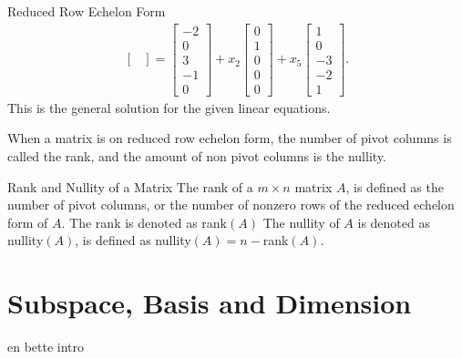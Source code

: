 \begin{example}{Reduced Row Echelon Form}
\begin{align*}
\begin{bmatrix}
        \end{bmatrix}=
        \begin{bmatrix}
      	    -2\\ 0 \\ 3 \\-1 \\0
        \end{bmatrix} + x_2
        \begin{bmatrix}
            0 \\ 1 \\ 0 \\ 0 \\ 0 
        \end{bmatrix} + x_5
        \begin{bmatrix}
            1 \\ 0 \\ -3 \\ -2 \\ 1
        \end{bmatrix}.
    \end{align*}
This is the general solution for the given linear equations.
\end{example}
When a matrix is on reduced row echelon form, the number of pivot columns is called the rank, and the amount of non pivot columns is the nullity.
\begin{definition}{Rank and Nullity of a Matrix}\label{def:rank_nullity}
The rank of a $m \times n$ matrix $A$, is defined as the number of pivot columns, or the number of nonzero rows of the reduced echelon form of $A$. The rank is denoted as rank$(A)$
The nullity of $A$ is denoted as nullity$(A)$, is defined as nullity$(A)=n - $rank$(A)$.
\cite[47]{LiAl}
\end{definition}
\section{Subspace, Basis and Dimension}
en bette intro 

